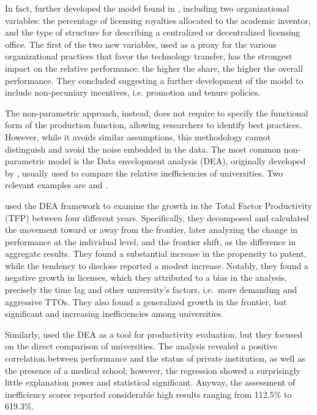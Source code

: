 In fact, \citet{Link2005} further developed the model found in \citet{Siegel2003a}, including two organizational variables: the percentage of licensing royalties allocated to the academic inventor, and the type of structure for describing a centralized or decentralized licensing office. The first of the two new variables, used as a proxy for the various organizational practices that favor the technology transfer, has the strongest impact on the relative performance: the higher the share, the higher the overall performance. They concluded suggesting a further development of the model to include non-pecuniary incentives, i.e. promotion and tenure policies. 

The non-parametric approach, instead, does not require to specify the functional form of the production function, allowing researchers to identify best practices. However, while it avoids similar assumptions, this methodology cannot distinguish and avoid the noise embedded in the data. The most common non-parametric model is the Data envelopment analysis (DEA), originally developed by \citet{Fare1993}, usually used to compare the relative inefficiencies of universities. Two relevant examples are \citet{Thursby2002} and \citet{Anderson2007}.

\citet{Thursby2002} used the DEA framework to examine the growth in the Total Factor Productivity (TFP) between four different years. Specifically, they decomposed and calculated the movement toward or away from the frontier, later analyzing the change in performance at the individual level, and the frontier shift, as the difference in aggregate results. They found a substantial increase in the propensity to patent, while the tendency to disclose reported a modest increase. Notably, they found a negative growth in licenses, which they attributed to a bias in the analysis, precisely  the time lag and other university's factors, i.e.\ more demanding and aggressive TTOs. They also found a generalized growth in the frontier, but significant and increasing inefficiencies among universities.

Similarly, \citet{Anderson2007} used the DEA as a tool for productivity evaluation, but they focused on the direct comparison of universities. The analysis revealed a positive correlation between performance and the status of private institution, as well as the presence of a medical school; however, the regression showed a surprisingly little explanation power and statistical significant. Anyway, the assessment of inefficiency scores reported considerable high results ranging from 112.5\% to 619.3\%.

